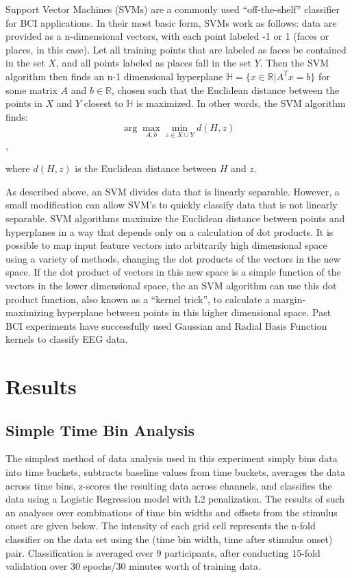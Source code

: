 \documentclass[11pt]{report}
\newcommand{\argmax}{\arg\!\max}
\begin{document}
	Support Vector Machines (SVMs) are a commonly used ``off-the-shelf'' classifier for BCI applications.  In their most basic form, SVMs work as follows:  data are provided as a n-dimensional vectors, with each point labeled -1 or 1 (faces or places, in this case).  Let all training points that are labeled as faces be contained in the set $X$, and all points labeled as places fall in the set $Y$.  Then the SVM algorithm then finds an n-1 dimensional hyperplane $\mathbb{H} = \{x\in \mathbb{R}| A^Tx=b\}$ for some matrix $A$ and $b\in \mathbb{R}$, chosen such that the Euclidean distance between the points in $X$ and $Y$ closest to $\mathbb{H}$ is maximized.  In other words, the SVM algorithm finds:
		$$ \argmax_{A,b} \min_{z\in X\cup Y} d(H,z) $$,
		
		where $d(H,z)$ is the Euclidean distance between $H$ and $z$.
		
	As described above, an SVM divides data that is linearly separable.  However, a small modification can allow SVM's to quickly classify data that is not linearly separable.  SVM algorithms maximize the Euclidean distance between points and hyperplanes in a way that depends only on a calculation of dot products.  It is possible to map input feature vectors into arbitrarily high dimensional space using a variety of methods, changing the dot products of the vectors in the new space.  If the dot product of vectors in this new space is a simple function of the vectors in the lower dimensional space, the an SVM algorithm can use this dot product function, also known as a ``kernel trick'', to calculate a margin-maximizing hyperplane between points in this higher dimensional space.  Past BCI experiments have successfully used Gaussian and 	Radial Basis Function kernels to classify EEG data\cite{Lotte}.



\section{Results}

\subsection{Simple Time Bin Analysis}

The simplest method of data analysis used in this experiment simply bins data into time buckets, subtracts baseline values from time buckets, averages the data across time bins, z-scores the resulting data across channels, and classifies the data using a Logistic Regression model with L2 penalization.  The results of such an analyses over combinations of time bin widths and offsets from the stimulus onset are given below.  The intensity of each grid cell represents the n-fold classifier on the data set using the (time bin width, time after stimulus onset) pair.  Classification is averaged over 9 participants, after conducting 15-fold validation over 30 epochs/30 minutes worth of training data.
\end{document}
